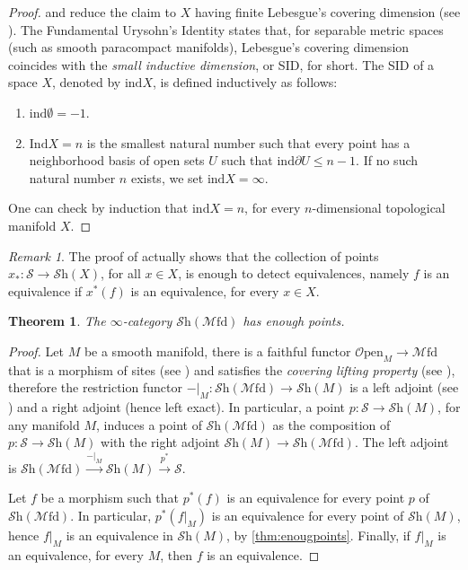 \documentclass[a4paper]{book}
\newcommand{\lM}{\mathcal{M}}
\newcommand{\lO}{\mathcal{O}}
\newcommand{\lS}{\mathcal{S}}
\newcommand{\Shv}{\lS\mathrm{h}} %
\newcommand{\Open}{\lO\mathrm{pen}} %
\newcommand{\Mfd}{\lM\mathrm{fd}} %
\newtheorem{theorem}[equation]{Theorem}
\theoremstyle{definition}
\theoremstyle{remark}
\newtheorem{remark}[equation]{Remark}
\numberwithin{equation}{section}
\begin{document}
\begin{proof}
	\cite[Corollary 7.2.1.17]{lurie2009htt} and \cite[Theorem 7.2.3.6]{lurie2009htt} reduce the claim to $X$ having finite Lebesgue's covering dimension (see \cite[Definition 7.2.3.1]{lurie2009htt}). The Fundamental Urysohn's Identity states that, for separable metric spaces (such as smooth paracompact manifolds), Lebesgue's covering dimension coincides with the \emph{small inductive dimension}, or SID, for short. The SID of a space $X$, denoted by $\mathrm{ind}X$, is defined inductively as follows: 
	\begin{enumerate}
		\item $\mathrm{ind}\emptyset=-1$.
		\item $\mathrm{Ind}X=n$ is the smallest natural number such that every point has a neighborhood basis of open sets $U$ such that $\mathrm{ind}\partial U\leq n-1$. If no such natural number $n$ exists, we set $\mathrm{ind}X=\infty$.
	\end{enumerate}One can check by induction that $\mathrm{ind} X=n$, for every $n$-dimensional topological manifold $X$.
\end{proof}
\begin{remark}\label{rmk:geopoints}
	The proof of \cite[Corollary 7.2.1.17]{lurie2009htt} actually shows that the collection of points $x_*:\lS\to\Shv(X)$, for all $x\in X$, is enough to detect equivalences, namely $f$ is an equivalence if $x^*(f)$ is an equivalence, for every $x\in X$. 
\end{remark}
\begin{theorem}\label{thm:mfdenoughpoints}
	The $\infty$-category $\Shv(\Mfd)$ has enough points. 
\end{theorem}
\begin{proof}
	Let $M$ be a smooth manifold, there is a faithful functor $\Open_M\to\Mfd$ that is a morphism of sites (see \cite[Definition A.10]{pstragowski2022syntheticspectracellularmotivic}) and satisfies the \emph{covering lifting property} (see \cite[Definition A.12]{pstragowski2022syntheticspectracellularmotivic}), therefore the restriction functor $-|_{M}:\Shv(\Mfd)\to\Shv(M)$ is a left adjoint (see \cite[Proposition A.13]{pstragowski2022syntheticspectracellularmotivic}) and a right adjoint (hence left exact). In particular, a point $p:\lS\to\Shv(M)$, for any manifold $M$, induces a point of $\Shv(\Mfd)$ as the composition of $p:\lS\to\Shv(M)$ with the right adjoint $\Shv(M)\to\Shv(\Mfd)$. The left adjoint is $\Shv(\Mfd)\xrightarrow{-|_M}\Shv(M)\xrightarrow{p^*}\lS$. 
	
	Let $f$ be a morphism such that $p^*(f)$ is an equivalence for every point $p$ of $\Shv(\Mfd)$. In particular, $p^*(f|_M)$ is an equivalence for every point of $\Shv(M)$, hence $f|_M$ is an equivalence in $\Shv(M)$, by \cref{thm:enougpoints}. Finally, if $f|_M$ is an equivalence, for every $M$, then $f$ is an equivalence. 
\end{proof}
\end{document}
